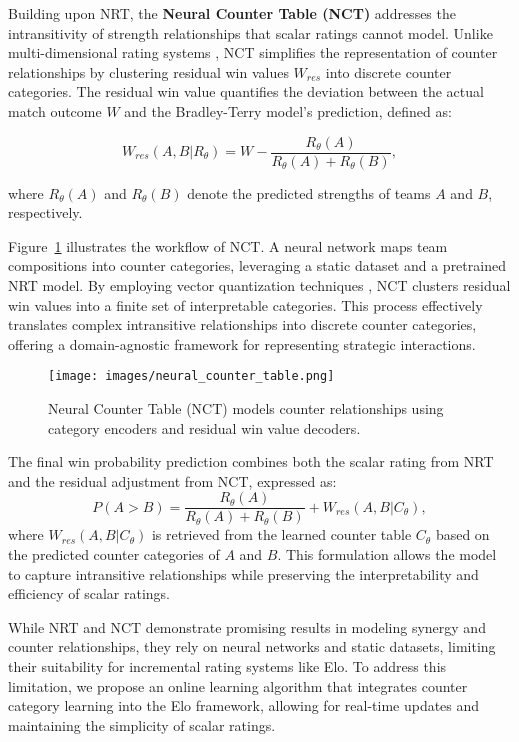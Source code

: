 Building upon NRT, the \textbf{Neural Counter Table (NCT)} addresses the intransitivity of strength relationships that scalar ratings cannot model. Unlike multi-dimensional rating systems \citep{nd_ability, m_elo, hyperbolic_elo}, NCT simplifies the representation of counter relationships by clustering residual win values $W_{res}$ into discrete counter categories. The residual win value quantifies the deviation between the actual match outcome $W$ and the Bradley-Terry model's prediction, defined as:

\begin{equation} \label{equation:residual_win_value} W_{res}(A, B | R_{\theta}) = W - \frac{R_{\theta}(A)}{R_{\theta}(A) + R_{\theta}(B)}, \end{equation}

where $R_{\theta}(A)$ and $R_{\theta}(B)$ denote the predicted strengths of teams $A$ and $B$, respectively.

Figure~\ref{figure:neural_counter_table} illustrates the workflow of NCT. A neural network maps team compositions into counter categories, leveraging a static dataset and a pretrained NRT model. By employing vector quantization techniques \citep{vq_vae}, NCT clusters residual win values into a finite set of interpretable categories. This process effectively translates complex intransitive relationships into discrete counter categories, offering a domain-agnostic framework for representing strategic interactions.

\begin{figure}[t] \centering \texttt{[image: images/neural\_counter\_table.png]} \caption{Neural Counter Table (NCT) models counter relationships using category encoders and residual win value decoders.} \label{figure:neural_counter_table} \end{figure}

The final win probability prediction combines both the scalar rating from NRT and the residual adjustment from NCT, expressed as:
\begin{equation} P(A > B) = \frac{R_{\theta}(A)}{R_{\theta}(A) + R_{\theta}(B)} + W_{res}(A, B | C_\theta), \end{equation}
where $W_{res}(A, B | C_\theta)$ is retrieved from the learned counter table $C_\theta$ based on the predicted counter categories of $A$ and $B$. This formulation allows the model to capture intransitive relationships while preserving the interpretability and efficiency of scalar ratings.

While NRT and NCT demonstrate promising results in modeling synergy and counter relationships, they rely on neural networks and static datasets, limiting their suitability for incremental rating systems like Elo. To address this limitation, we propose an online learning algorithm that integrates counter category learning into the Elo framework, allowing for real-time updates and maintaining the simplicity of scalar ratings.

